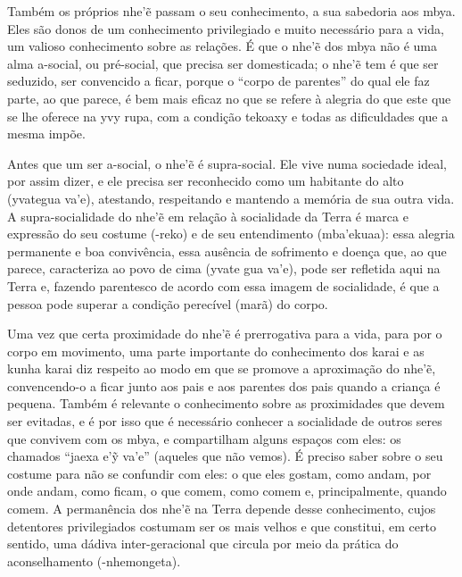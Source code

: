 Também os próprios nhe’\~{e} passam o seu conhecimento, a sua
sabedoria aos mbya. Eles são donos de um conhecimento privilegiado e
muito necessário para a vida, um valioso conhecimento sobre as
relações. É que o nhe’\~{e} dos mbya não é uma alma a-social, ou
pré-social, que precisa ser domesticada; o nhe’\~{e} tem é que ser
seduzido, ser convencido a ficar, porque o ``corpo de parentes'' do qual
ele faz parte, ao que parece, é bem mais eficaz no que se refere à
alegria do que este que se lhe oferece na yvy rupa, com a condição
tekoaxy e todas as dificuldades que a mesma impõe.

Antes que um ser a-social, o nhe’\~{e} é supra-social. Ele vive numa
sociedade ideal, por assim dizer, e ele precisa ser reconhecido como um
habitante do alto (yvategua va’e), atestando, respeitando e mantendo a
memória de sua outra vida. A supra-socialidade do nhe’\~{e} em
relação à socialidade da Terra é marca e expressão do seu costume
(-reko) e de seu entendimento (mba’ekuaa): essa alegria permanente e
boa convivência, essa ausência de sofrimento e doença que, ao que
parece, caracteriza ao povo de cima (yvate gua va’e), pode ser
refletida aqui na Terra e, fazendo parentesco de acordo com essa imagem
de socialidade, é que a pessoa pode superar a condição perecível (marã)
do corpo.

Uma vez que certa proximidade do nhe’\~{e} é prerrogativa para a vida,
para por o corpo em movimento, uma parte importante do conhecimento dos
karai e as kunha karai diz respeito ao modo em que se promove a
aproximação do nhe’\~{e}, convencendo-o a ficar junto aos pais e aos
parentes dos pais quando a criança é pequena. Também é relevante o
conhecimento sobre as proximidades que devem ser evitadas, e é por isso
que é necessário conhecer a socialidade de outros seres que convivem
com os mbya, e compartilham alguns espaços com eles: os chamados ``jaexa
e’\~{y} va’e'' (aqueles que não vemos). É preciso saber sobre o seu
costume para não se confundir com eles: o que eles gostam, como andam,
por onde andam, como ficam, o que comem, como comem e, principalmente,
quando comem. A permanência dos nhe’\~{e} na Terra depende desse
conhecimento, cujos detentores privilegiados costumam ser os mais
velhos e que constitui, em certo sentido, uma dádiva inter-geracional
que circula por meio da prática do aconselhamento ({}-nhemongeta).

